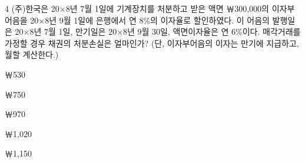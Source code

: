 \begin{question}{4}
(주)한국은 20×8년 7월 1일에 기계장치를 처분하고 받은 액면 ￦300,000의 이자부어음을 20×8년 9월 1일에 은행에서 연 8\%의 이자율로 할인하였다. 이 어음의 발행일은 20×8년 7월 1일, 만기일은 20×8년 9월 30일, 액면이자율은 연 6\%이다. 매각거래를 가정할 경우 채권의 처분손실은 얼마인가? (단, 이자부어음의 이자는 만기에 지급하고, 월할 계산한다.)
\begin{choices}
  \item ￦530
  \item ￦750
  \item ￦970
  \item ￦1,020
  \item ￦1,150
\end{choices}
\end{question}

